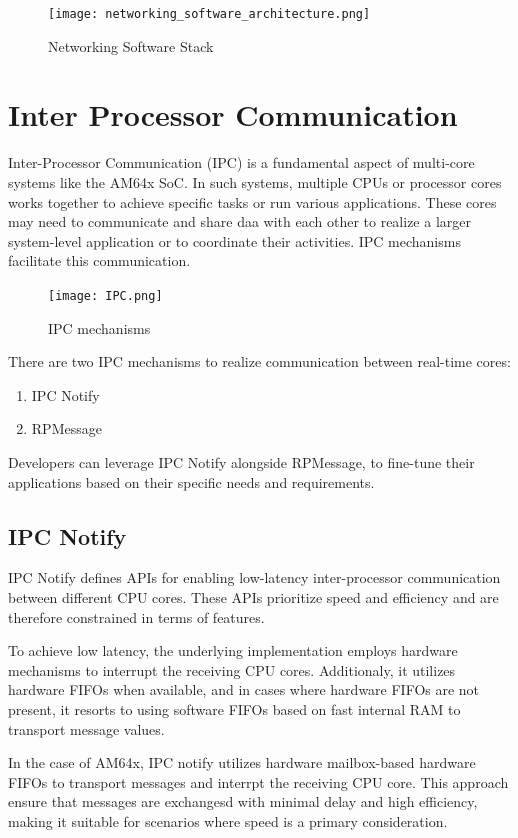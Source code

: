 \begin{figure}[ht]
    \centering
    \texttt{[image: networking\_software\_architecture.png]}
    \caption{Networking Software Stack}
\end{figure}

\section{Inter Processor Communication}

Inter-Processor Communication (IPC) is a fundamental aspect of multi-core
systems like the AM64x SoC. In such systems, multiple CPUs or processor cores
works together to achieve specific tasks or run various applications.
These cores may need to communicate and share daa with each other to realize a
larger system-level application or to coordinate their activities.
IPC mechanisms facilitate this communication.

\begin{figure}[ht]
    \centering
    \texttt{[image: IPC.png]}
    \caption{IPC mechanisms}
\end{figure}

There are two IPC mechanisms to realize communication between real-time cores:

\begin{enumerate}
    \item   IPC Notify
    \item   RPMessage
\end{enumerate}

Developers can leverage IPC Notify alongside RPMessage, to fine-tune their
applications based on their specific needs and requirements.

\subsection{IPC Notify}

IPC Notify defines APIs for enabling low-latency inter-processor communication
between different CPU cores. These APIs prioritize speed and efficiency and are
therefore constrained in terms of features.

To achieve low latency, the underlying implementation employs hardware
mechanisms to interrupt the receiving CPU cores. Additionaly, it utilizes
hardware FIFOs when available, and in cases where hardware FIFOs are not
present, it resorts to using software FIFOs based on fast internal RAM to
transport message values.

In the case of AM64x, IPC notify utilizes hardware mailbox-based hardware FIFOs
to transport messages and interrpt the receiving CPU core.
This approach ensure that messages are exchangesd with minimal delay and high
efficiency, making it suitable for scenarios where speed is a primary
consideration.

